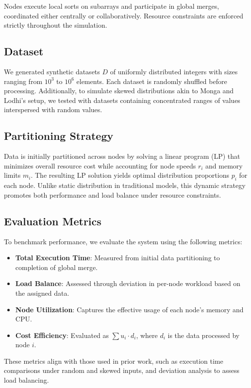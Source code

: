 \documentclass[]{interact}
\theoremstyle{plain}
\theoremstyle{definition}
\theoremstyle{remark}
\begin{document}
Nodes execute local sorts on subarrays and participate in global merges, coordinated either centrally or collaboratively. Resource constraints are enforced strictly throughout the simulation.

\subsection{Dataset}
We generated synthetic datasets $D$ of uniformly distributed integers with sizes ranging from $10^3$ to $10^6$ elements. Each dataset is randomly shuffled before processing. Additionally, to simulate skewed distributions akin to Monga and Lodhi’s setup, we tested with datasets containing concentrated ranges of values interspersed with random values.

\subsection{Partitioning Strategy}
Data is initially partitioned across nodes by solving a linear program (LP) that minimizes overall resource cost while accounting for node speeds $r_i$ and memory limits $m_i$. The resulting LP solution yields optimal distribution proportions $p_i$ for each node. Unlike static distribution in traditional models, this dynamic strategy promotes both performance and load balance under resource constraints.

\subsection{Evaluation Metrics}
To benchmark performance, we evaluate the system using the following metrics:
\begin{itemize}
\item \textbf{Total Execution Time}: Measured from initial data partitioning to completion of global merge.
\item \textbf{Load Balance}: Assessed through deviation in per-node workload based on the assigned data.
\item \textbf{Node Utilization}: Captures the effective usage of each node’s memory and CPU.
\item \textbf{Cost Efficiency}: Evaluated as $\sum u_i \cdot d_i$, where $d_i$ is the data processed by node $i$.
\end{itemize}

These metrics align with those used in prior work, such as execution time comparisons under random and skewed inputs, and deviation analysis to assess load balancing.
\end{document}
